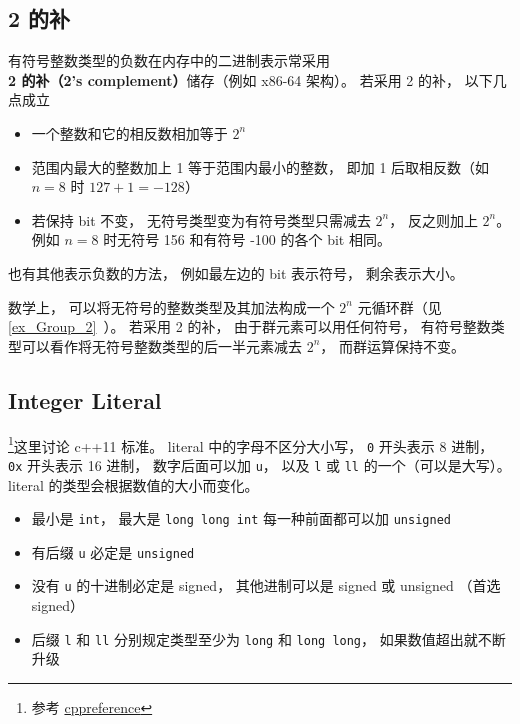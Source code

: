 \subsection{2 的补}
有符号整数类型的负数在内存中的二进制表示常采用 \textbf{2 的补（2's complement）}储存（例如 x86-64 架构）。 若采用 2 的补， 以下几点成立
\begin{itemize}
\item 一个整数和它的相反数相加等于 $2^n$
\item 范围内最大的整数加上 1 等于范围内最小的整数， 即加 1 后取相反数（如 $n = 8$ 时 $127 + 1 = -128$）
\item 若保持 bit 不变， 无符号类型变为有符号类型只需减去 $2^n$， 反之则加上 $2^n$。 例如 $n = 8$ 时无符号 156 和有符号 -100 的各个 bit 相同。
\end{itemize}

也有其他表示负数的方法， 例如最左边的 bit 表示符号， 剩余表示大小。

数学上， 可以将无符号的整数类型及其加法构成一个 $2^n$ 元循环群（见\autoref{ex_Group_2}~）。 若采用 2 的补， 由于群元素可以用任何符号， 有符号整数类型可以看作将无符号整数类型的后一半元素减去 $2^n$， 而群运算保持不变。

\subsection{Integer Literal}
\footnote{参考 \href{https://en.cppreference.com/w/cpp/language/integer_literal}{cppreference}}这里讨论 c++11 标准。 literal 中的字母不区分大小写， \verb|0| 开头表示 8 进制，  \verb|0x| 开头表示 16 进制， 数字后面可以加 \verb|u|， 以及 \verb|l| 或 \verb|ll| 的一个（可以是大写）。 literal 的类型会根据数值的大小而变化。

\begin{itemize}
\item 最小是 \verb|int|， 最大是 \verb|long long int| 每一种前面都可以加 \verb|unsigned|
\item 有后缀 \verb|u| 必定是 \verb|unsigned|
\item 没有 \verb|u| 的十进制必定是 signed， 其他进制可以是 signed 或 unsigned （首选 signed）
\item 后缀 \verb|l| 和 \verb|ll| 分别规定类型至少为 \verb|long| 和 \verb|long long|， 如果数值超出就不断升级
\end{itemize}
